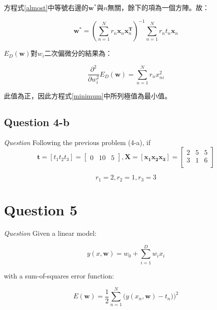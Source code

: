 \documentclass{article}
\begin{document}
方程式\ref{almost}中等號右邊的$\mathbf w^*$與$n$無關，餘下的項為一個方陣。故：

\begin{equation}\label{minimum}
\mathbf w^*=(\sum\limits_{n=1}^N r_n \mathbf x_n \mathbf x_n^{\mathbf T})^{-1}\sum\limits_{n=1}^N r_n t_n \mathbf x_n
\end{equation}

$E_D(\mathbf w)$對$w_i$二次偏微分的結果為：

\begin{equation}
\frac{\partial^2}{\partial w_i^2}E_D(\mathbf w)
=\sum\limits_{n=1}^N r_n x_{ni}^2
\end{equation}

此值為正，因此方程式\ref{minimum}中所列極值為最小值。

\subsection{Question 4-b}

\emph{Question} Following the previous problem (4-a), if
\begin{equation*}
\mathbf t = [t_1 t_2 t_3] = \begin{bmatrix}
    0&10&5
\end{bmatrix},
\mathbf X=[\mathbf{x_1 x_2 x_3}] = \begin{bmatrix}
    2 & 5 & 5 \\[0.3em]
    3 & 1 & 6 \\[0.3em]
\end{bmatrix}
\end{equation*}

\begin{equation*}
r_1 = 2, r_2 = 1, r_3 = 3
\end{equation*}

\section{Question 5}
\emph{Question} Given a linear model:

\begin{equation*}
y(x, \mathbf w) = w_0 + \sum_{i=1}^{D}w_i x_i
\end{equation*}

with a sum-of-squares error function:

\begin{equation*}
E(\mathbf w) = \frac 1 2 \sum_{n=1}^{N} \big(y(x_n, \mathbf w) -t_n ) \big)^2
\end{equation*}
\end{document}
